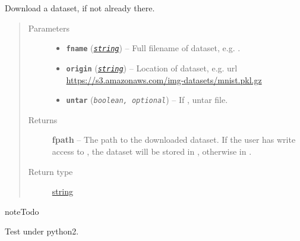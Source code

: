 \documentclass[letterpaper,10pt,english]{sphinxmanual}
\begin{document}

\begin{fulllineitems}
\label{snntoolbox.io_utils:snntoolbox.io_utils.common.download_dataset}
Download a dataset, if not already there.
\begin{quote}\begin{description}
\item[{Parameters}] \leavevmode\begin{itemize}
\item {} 
\textbf{\texttt{fname}} (\href{https://docs.python.org/library/string.html\#module-string}{\emph{\texttt{string}}}) -- Full filename of dataset, e.g. .

\item {} 
\textbf{\texttt{origin}} (\href{https://docs.python.org/library/string.html\#module-string}{\emph{\texttt{string}}}) -- Location of dataset, e.g. url
\url{https://s3.amazonaws.com/img-datasets/mnist.pkl.gz}

\item {} 
\textbf{\texttt{untar}} (\emph{\texttt{boolean, optional}}) -- If , untar file.

\end{itemize}

\item[{Returns}] \leavevmode
\textbf{fpath} -- The path to the downloaded dataset. If the user has write access to
, the dataset will be stored in ,
otherwise in .

\item[{Return type}] \leavevmode
\href{https://docs.python.org/library/string.html\#module-string}{string}

\end{description}\end{quote}

\begin{notice}{note}{Todo}

Test under python2.
\end{notice}

\end{fulllineitems}

\end{document}
